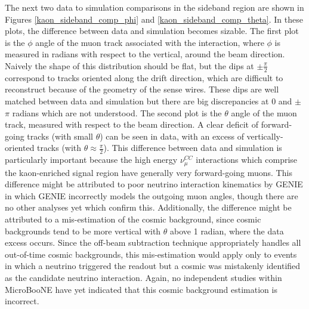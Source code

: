 The next two data to simulation comparisons in the sideband region are shown in Figures \ref{kaon_sideband_comp_phi} and \ref{kaon_sideband_comp_theta}. In these plots, the difference between data and simulation becomes sizable. The first plot is the $\phi$ angle of the muon track associated with the interaction, where $\phi$ is measured in radians with respect to the vertical, around the beam direction. Naively the shape of this distribution should be flat, but the dips at $\pm\frac{\pi}{2}$ correspond to tracks oriented along the drift direction, which are difficult to reconstruct because of the geometry of the sense wires. These dips are well matched between data and simulation but there are big discrepancies at 0 and $\pm$ $\pi$ radians which are not understood. The second plot is the $\theta$ angle of the muon track, measured with respect to the beam direction. A clear deficit of forward-going tracks (with small $\theta$) can be seen in data, with an excess of vertically-oriented tracks (with $\theta\approx\frac{\pi}{2}$). This difference between data and simulation is particularly important because the high energy $\nu_\mu^{CC}$ interactions which comprise the kaon-enriched signal region have generally very forward-going muons. This difference might be attributed to poor neutrino interaction kinematics by GENIE in which GENIE incorrectly models the outgoing muon angles, though there are no other analyses yet which confirm this. Additionally, the difference might be attributed to a mis-estimation of the cosmic background, since cosmic backgrounds tend to be more vertical with $\theta$ above 1 radian, where the data excess occurs. Since the off-beam subtraction technique appropriately handles all out-of-time cosmic backgrounds, this mis-estimation would apply only to events in which a neutrino triggered the readout but a cosmic was mistakenly identified as the candidate neutrino interaction. Again, no independent studies within MicroBooNE have yet indicated that this cosmic background estimation is incorrect.\\

